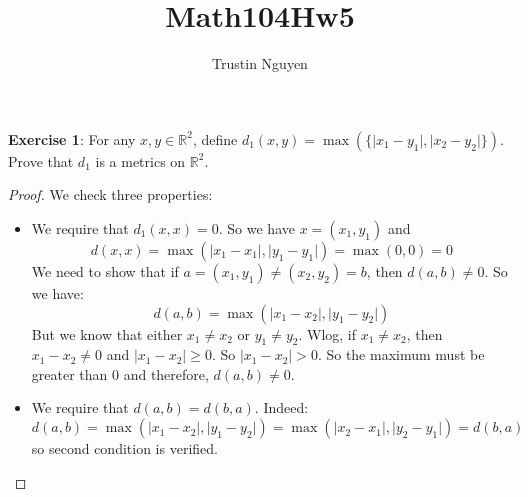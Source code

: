 \documentclass{article}
\title{Math104Hw5}
\author{Trustin Nguyen}
\begin{document}
    \maketitle

\reversemarginpar

\textbf{Exercise 1}: For any $x, y \in \mathbb{R}^{2}$, define $d_{1}(x, y) = \max(\{\lvert x_{1} - y_{1} \rvert, \lvert x_{2} - y_{2} \rvert\})$. Prove that $d_{1}$ is a metrics on $\mathbb{R}^{2}$.
    \begin{proof}
        We check three properties:
            \begin{itemize}
                \item We require that $d_{1}(x, x) = 0$. So we have $x = (x_{1}, y_{1})$ and
                    \begin{equation*}
                        d(x, x) = \max(\lvert x_{1} - x_{1} \rvert, \lvert y_{1} - y_{1} \rvert) = \max(0, 0) = 0
                    \end{equation*}
                    We need to show that if $a = (x_{1}, y_{1}) \neq (x_{2}, y_{2}) = b$, then $d(a, b) \neq 0$. So we have:
                        \begin{equation*}
                            d(a, b) = \max(\lvert x_{1} - x_{2} \rvert, \lvert y_{1} - y_{2} \rvert)
                        \end{equation*}
                    But we know that either $x_{1} \neq x_{2}$ or $y_{1} \neq y_{2}$. Wlog, if $x_{1} \neq x_{2}$, then $x_{1} - x_{2} \neq 0$ and $\lvert x_{1} - x_{2} \rvert \geq 0$. So $\lvert x_{1} - x_{2} \rvert > 0$. So the maximum must be greater than $0$ and therefore, $d(a, b) \neq 0$.

                \item We require that $d(a, b) = d(b, a)$. Indeed:
                    \begin{equation*}
                        d(a, b) = \max(\lvert x_{1} - x_{2} \rvert, \lvert y_{1} - y_{2} \rvert) = \max(\lvert x_{2} - x_{1} \rvert, \lvert y_{2} - y_{1} \rvert) = d(b, a)
                    \end{equation*}
                so second condition is verified.


\end{itemize}
\end{proof}
\end{document}
